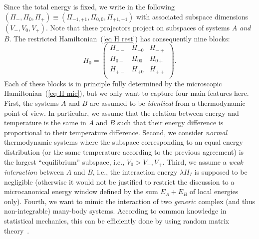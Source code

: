 \documentclass[pre,onecolumn,12pt,aps,longbibliography,nofootinbib]{revtex4-2}
\begin{document}
Since the total energy is fixed, we write in the following $(\Pi_-,\Pi_0,\Pi_+) \equiv (\Pi_{-1,+1},\Pi_{0,0},\Pi_{+1,-1})$ with associated subspace dimensions $(V_-,V_0,V_+)$. Note that these projectors project on subspaces of systems $A$ \emph{and} $B$. The restricted Hamiltonian~(\ref{eq H rest}) has consequently nine blocks:
\begin{equation}\label{eq block H}
 H_0 = \begin{pmatrix}
        H_{--} & H_{-0} & H_{-+} \\
        H_{0-} & H_{00} & H_{0+} \\
        H_{+-} & H_{+0} & H_{++} \\
       \end{pmatrix}.
\end{equation}
Each of these blocks is in principle fully determined by the microscopic Hamiltonian~(\ref{eq H mic}), but we only want to capture four main features here. First, the systems $A$ and $B$ are assumed to be \emph{identical} from a thermodynamic point of view. In particular, we assume that the relation between energy and temperature is the same in $A$ and $B$ such that their energy difference is proportional to their temperature difference. Second, we consider \emph{normal} thermodynamic systems where the subspace corresponding to an equal energy distribution (or the same temperature according to the previous agreement) is the largest ``equilibrium'' subspace, i.e., $V_0 > V_-,V_+$. Third, we assume a \emph{weak interaction} between $A$ and $B$, i.e., the interaction energy $\lambda H_I$ is supposed to be negligible (otherwise it would not be justified to restrict the discussion to a microcanonical energy window defined by the sum $E_A+E_B$ of local energies only). Fourth, we want to mimic the interaction of two \emph{generic} complex (and thus non-integrable) many-body systems. According to common knowledge in statistical mechanics, this can be efficiently done by using random matrix theory~\cite{Wigner1967, BrodyEtAlRMP1981, BeenakkerRMP1997, GuhrMuellerGroelingWeidenmuellerPR1998, HaakeBook2010, DAlessioEtAlAP2016, DeutschRPP2018}.
\end{document}
